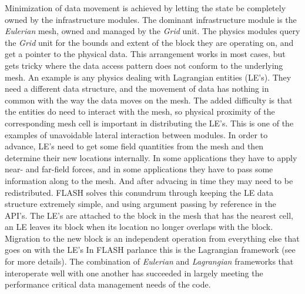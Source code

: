 Minimization of data movement is achieved by letting the state be
completely owned by the infrastructure modules. The dominant
infrastructure module is the {\em Eulerian} mesh, owned and managed by
the {\em Grid} unit. The physics modules query the {\em Grid} unit
for the bounds and extent of the block they are operating on, and
get a pointer to the physical data. This arrangement works in most
cases, but gets tricky where  the data access pattern does not conform
to the underlying mesh. An example is any physics dealing with
Lagrangian entities (LE's). They need a different data structure, and
the movement of data has nothing in common with the way the data moves
on the mesh. The added difficulty is that the entities do need to
interact with the mesh, so physical proximity of the corresponding
mesh cell is important in distributing the LE's. This is one of the
examples of unavoidable lateral interaction between modules. In order
to advance, LE's need to get some field quantities from the mesh and
then determine their new locations internally. In some applications
they have to apply near- and far-field forces, and in some
applications they have to pass some information along to the mesh. And
after advacing in time they may need to be redistributed. FLASH solves
this conundrum through keeping the LE data structure extremely simple,
and using argument passing by reference in the API's. The LE's are
attached to the block in the mesh that has the nearest cell, an LE
leaves its block when its location no longer overlaps with the
block. Migration to the new block is an independent operation from
everything else that goes on with the LE's In FLASH parlance this is
the Lagrangian framework (see \cite{Dubey2012} for more details). The
combination of {\em Eulerian} and {\em Lagrangian} frameworks that
interoperate well with one another has succeeded in largely meeting the
performance critical data management needs of the code. 

